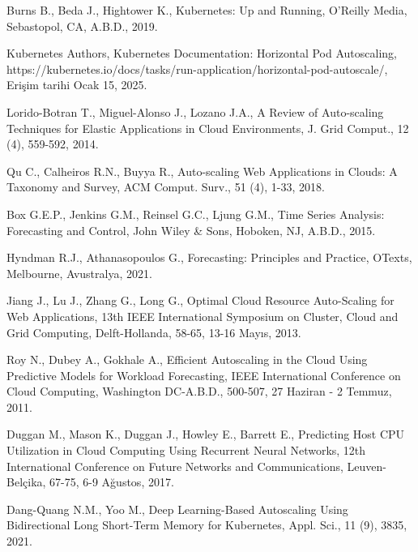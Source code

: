 \begin{enumerate}[label={[\arabic*]}]

\item Burns B., Beda J., Hightower K., Kubernetes: Up and Running, O'Reilly Media, Sebastopol, CA, A.B.D., 2019.

\item Kubernetes Authors, Kubernetes Documentation: Horizontal Pod Autoscaling, https://kubernetes.io/docs/tasks/run-application/horizontal-pod-autoscale/, Erişim tarihi Ocak 15, 2025.

\item Lorido-Botran T., Miguel-Alonso J., Lozano J.A., A Review of Auto-scaling Techniques for Elastic Applications in Cloud Environments, J. Grid Comput., 12 (4), 559-592, 2014.

\item Qu C., Calheiros R.N., Buyya R., Auto-scaling Web Applications in Clouds: A Taxonomy and Survey, ACM Comput. Surv., 51 (4), 1-33, 2018.

\item Box G.E.P., Jenkins G.M., Reinsel G.C., Ljung G.M., Time Series Analysis: Forecasting and Control, John Wiley \& Sons, Hoboken, NJ, A.B.D., 2015.

\item Hyndman R.J., Athanasopoulos G., Forecasting: Principles and Practice, OTexts, Melbourne, Avustralya, 2021.

\item Jiang J., Lu J., Zhang G., Long G., Optimal Cloud Resource Auto-Scaling for Web Applications, 13th IEEE International Symposium on Cluster, Cloud and Grid Computing, Delft-Hollanda, 58-65, 13-16 Mayıs, 2013.

\item Roy N., Dubey A., Gokhale A., Efficient Autoscaling in the Cloud Using Predictive Models for Workload Forecasting, IEEE International Conference on Cloud Computing, Washington DC-A.B.D., 500-507, 27 Haziran - 2 Temmuz, 2011.

\item Duggan M., Mason K., Duggan J., Howley E., Barrett E., Predicting Host CPU Utilization in Cloud Computing Using Recurrent Neural Networks, 12th International Conference on Future Networks and Communications, Leuven-Belçika, 67-75, 6-9 Ağustos, 2017.

\item Dang-Quang N.M., Yoo M., Deep Learning-Based Autoscaling Using Bidirectional Long Short-Term Memory for Kubernetes, Appl. Sci., 11 (9), 3835, 2021.


\end{enumerate}
